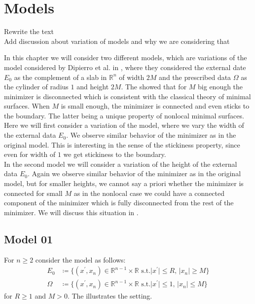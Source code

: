 \chapter{Models}
\label{ch:models}

\begin{TODO}
	Rewrite the text \\
	Add discussion about variation of models and why we are considering that
\end{TODO}

In this chapter we will consider two different models, which are variations of the model
considered by Dipierro et al. in \cite{dipierro2020disconnectedness}, where they
considered the external date \( E_{0} \) as the complement of a slab in \( \mathbb{R}^{n}
\) of width \( 2M \) and the prescribed data \( \Omega  \) as the cylinder of radius \( 1
\) and height \( 2M \). The showed that for \( M \) big enough the minimizer is
disconnected which is consistent with the classical theory of minimal surfaces. When \( M
\) is small enough, the minimizer is connected and even sticks to the boundary. The latter
being a unique property of nonlocal minimal surfaces. \\
Here we will first consider a variation of the model, where we vary the width of the
external data \( E_{0} \). We observe similar behavior of the minimizer as in the original
model. This is interesting in the sense of the stickiness property, since even for width
of \( 1 \) we get stickiness to the boundary. \\
In the second model we will consider a variation of the height of the external data \(
E_{0} \). Again we observe similar behavior of the minimizer as in the original model, but
for smaller heights, we cannot say a priori whether the minimizer is connected for small
\( M \) as in the nonlocal case we could have a connected component of the minimizer which
is fully disconnected from the rest of the minimizer. We will discuss this situation in . 


\section{Model 01}
\label{sec:model01}


For \( n \geq 2 \) consider the model as follows:
\begin{align}
	E_0    & \coloneqq \{(x^\prime,x_n) \in \mathbb{R}^{n-1} \times \mathbb{R} \text{ s.t.} \lvert x^\prime \rvert \leq R, \, \lvert x_n \rvert \geq M \} \\
	\Omega & \coloneqq \{(x^\prime,x_n) \in \mathbb{R}^{n-1} \times \mathbb{R} \text{ s.t.} \lvert x^\prime \rvert \leq 1, \, \lvert x_n \rvert \leq M \}
\end{align}
for \( R \geq 1 \) and \( M > 0 \). The  illustrates the setting.

